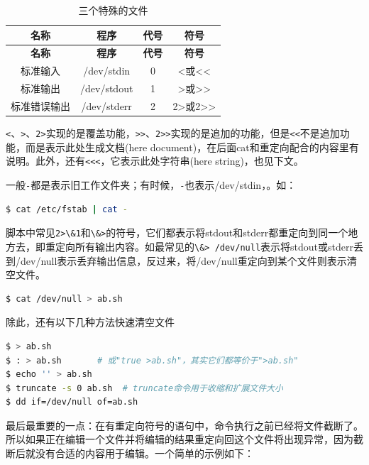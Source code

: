 \documentclass[doctor,openright,twoside]{sjtuthesis}
\newcommand{\passthrough}[1]{#1}
\theoremstyle{plain}
\theoremstyle{definition}
\theoremstyle{remark}
\theoremstyle{ocrenumbox}
\theoremstyle{plain}
\begin{document}
\begin{longtable}[]{@{}cccc@{}}
\caption{三个特殊的文件}\tabularnewline
\toprule
\textbf{名称} & \textbf{程序} & \textbf{代号} &
\textbf{符号}\tabularnewline
\midrule
\endfirsthead
\toprule
\textbf{名称} & \textbf{程序} & \textbf{代号} &
\textbf{符号}\tabularnewline
\midrule
\endhead
标准输入 & /dev/stdin & 0 &
\textless{}或\textless{}\textless{}\tabularnewline
标准输出 & /dev/stdout & 1 &
\textgreater{}或\textgreater{}\textgreater{}\tabularnewline
标准错误输出 & /dev/stderr & 2 &
2\textgreater{}或2\textgreater{}\textgreater{}\tabularnewline
\bottomrule
\end{longtable}

\passthrough{\lstinline!<!}、\passthrough{\lstinline!>!}、\passthrough{\lstinline!2>!}实现的是覆盖功能，\passthrough{\lstinline!>>!}、\passthrough{\lstinline!2>>!}实现的是追加的功能，但是\passthrough{\lstinline!<<!}不是追加功能，而是表示此处生成文档(here
document)，在后面cat和重定向配合的内容里有说明。此外，还有\passthrough{\lstinline!<<<!}，它表示此处字符串(here
string)，也见下文。

一般\passthrough{\lstinline!-!}都是表示旧工作文件夹；有时候，\passthrough{\lstinline!-!}也表示/dev/stdin，。如：

\begin{lstlisting}[language=bash]
$ cat /etc/fstab | cat -
\end{lstlisting}

脚本中常见\passthrough{\lstinline!2>\&1!}和\passthrough{\lstinline!\&>!}的符号，它们都表示将stdout和stderr都重定向到同一个地方去，即重定向所有输出内容。如最常见的\passthrough{\lstinline!\&> /dev/null!}表示将stdout或stderr丢到/dev/null表示丢弃输出信息，反过来，将/dev/null重定向到某个文件则表示清空文件。

\begin{lstlisting}[language=bash]
$ cat /dev/null > ab.sh
\end{lstlisting}

除此，还有以下几种方法快速清空文件

\begin{lstlisting}[language=bash]
$ > ab.sh
$ : > ab.sh       # 或"true >ab.sh"，其实它们都等价于">ab.sh"
$ echo '' > ab.sh
$ truncate -s 0 ab.sh  # truncate命令用于收缩和扩展文件大小
$ dd if=/dev/null of=ab.sh
\end{lstlisting}

最后最重要的一点：在有重定向符号的语句中，命令执行之前已经将文件截断了。所以如果正在编辑一个文件并将编辑的结果重定向回这个文件将出现异常，因为截断后就没有合适的内容用于编辑。一个简单的示例如下：
\end{document}
